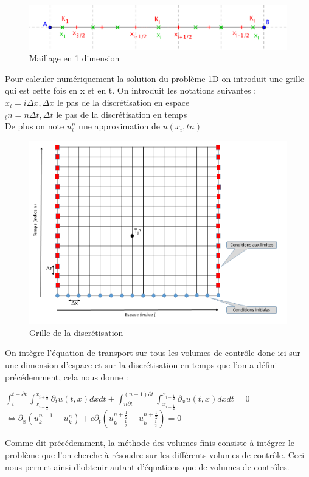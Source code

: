 \documentclass[12pt]{article}
\begin{document}
    \begin{figure}[H]
	\centering
	\includegraphics[scale=0.4]{VF2.png}
	\caption{Maillage en 1 dimension}
	\label{1D}
	\end{figure}

\noindent Pour calculer numériquement la solution du problème 1D on introduit une grille qui est cette fois en x et en t.
\newpage
\noindent On introduit les notations suivantes :
\\
 $x_i=i\Delta x, \Delta x$ le pas de la discrétisation en espace
\\
$_ tn=n\Delta t, \Delta t$ le pas de la discrétisation en temps
\\De plus on note $u_i^n$ une approximation de $u(x_i,tn)$
 \begin{figure}[H]
	\centering
	\includegraphics[scale=0.3]{DFGrille.PNG}
	\caption{Grille de la discrétisation}
	\label{1D}
	\end{figure}
\noindent On intègre l’équation de transport sur tous les volumes de contrôle donc ici sur une dimension d'espace et sur la discrétisation en temps que l'on a défini précédemment, cela nous donne :

\begin{center}
      $ \displaystyle \int_{t}^{t+\partial t}\int_{x_{i-\frac{1}{2}}}^{x_{i+\frac{1}{2}}}\partial_tu(t,x) dxdt + \int_{n\partial t}^{(n+1)\partial t}\int_{x_{i-\frac{1}{2}}}^{x_{i+\frac{1}{2}}} \partial_xu(t,x) dxdt =0$
      \\$\Leftrightarrow \displaystyle \partial_x (u_k^{n+1} -u_k^n) + c\partial_t \left(u_{k+\frac{1}{2}}^{n+\frac{1}{2}}-u_{k-\frac{1}{2}}^{n+\frac{1}{2}}\right)=0$
\end{center}
\noindent Comme dit précédemment, la méthode des volumes finis consiste à intégrer le problème que l'on cherche à résoudre sur les différents volumes de contrôle. Ceci nous permet ainsi d'obtenir autant d'équations que de volumes de contrôles. 
\end{document}
